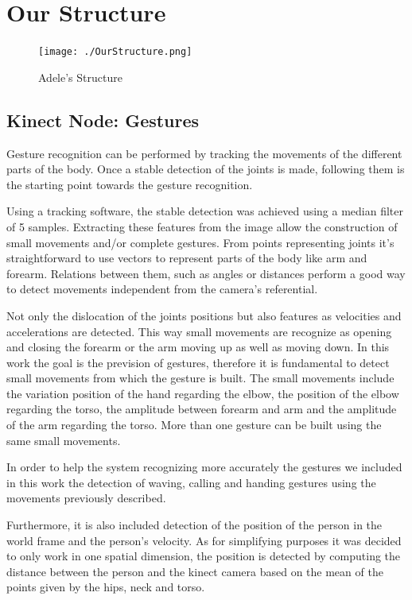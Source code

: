 \section{Our Structure}
\begin{figure}[!h]
    \centering
    \texttt{[image: ./OurStructure.png]}
    \caption{Adele's Structure}
    \label{fig:adele_structure}
\end{figure}

\subsection{Kinect Node: Gestures}
Gesture recognition can be performed by tracking the movements of the different parts of the body. Once a stable detection of the joints is made, following them is the starting point towards the gesture recognition. 

Using a tracking software, the stable detection was achieved using a median filter of 5 samples.  Extracting these features from the image allow the construction of small movements and/or complete gestures. From points representing joints it's straightforward to use vectors to represent parts of the body like arm and forearm. Relations between them, such as angles or distances perform a good way to detect movements independent from the camera's referential.  

Not only the dislocation of the joints positions but also features as velocities and accelerations are detected. This way small movements are recognize as opening and closing the forearm or the arm moving up as well as moving down. In this work the goal is the prevision of gestures, therefore it is fundamental to detect small movements from which the gesture is built. The small movements include the variation position of the hand regarding the elbow, the position of the elbow regarding the torso, the amplitude between forearm and arm and the amplitude of the arm regarding the torso. More than one gesture can be built using the same small movements.

In order to help the system recognizing more accurately the gestures we included in this work the detection of waving, calling and handing gestures using the movements previously described.

Furthermore, it is also included detection of the position of the person in the world frame and the person's velocity. As for simplifying purposes it was decided to only work in one spatial dimension, the position is detected by computing the distance between the person and the kinect camera based on the mean of the points given by the hips, neck and torso. 

